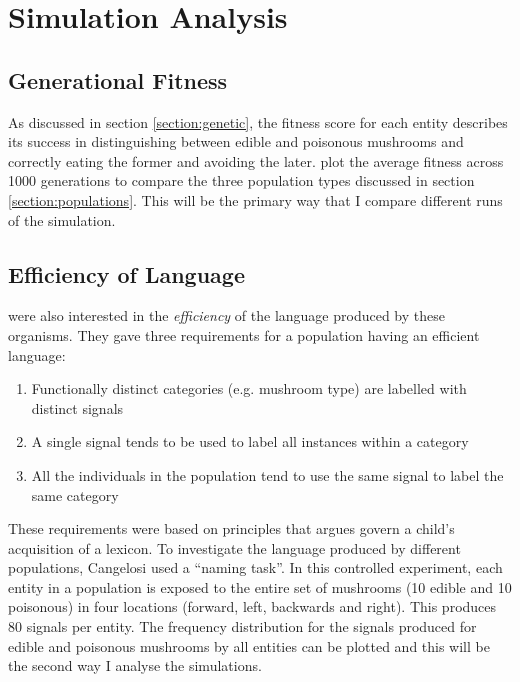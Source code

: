 \documentclass[12pt,a4paper,twoside,openright]{report}
\begin{document}
\section{Simulation Analysis}\label{section:analysis}

\subsection{Generational Fitness}

As discussed in section \ref{section:genetic}, the fitness score for each entity describes its success in distinguishing between edible and poisonous mushrooms and correctly eating the former and avoiding the later. \cite{Cangelosi1998} plot the average fitness across 1000 generations to compare the three population types discussed in section \ref{section:populations}. This will be the primary way that I compare different runs of the simulation.

\subsection{Efficiency of Language}\label{section:efficiency}

\cite{Cangelosi1998} were also interested in the \emph{efficiency} of the language produced by these organisms. They gave three requirements for a population having an efficient language:

\begin{enumerate}
	\item Functionally distinct categories (e.g. mushroom type) are labelled with distinct signals
	\item A single signal tends to be used to label all instances within a category
	\item All the individuals in the population tend to use the same signal to label the same category
\end{enumerate}

These requirements were based on principles that \cite{Clark1995} argues govern a child's acquisition of a lexicon. To investigate the language produced by different populations, Cangelosi used a ``naming task''. In this controlled experiment, each entity in a population is exposed to the entire set of mushrooms (10 edible and 10 poisonous) in four locations (forward, left, backwards and right). This produces 80 signals per entity. The frequency distribution for the signals produced for edible and poisonous mushrooms by all entities can be plotted and this will be the second way I analyse the simulations.
\end{document}

